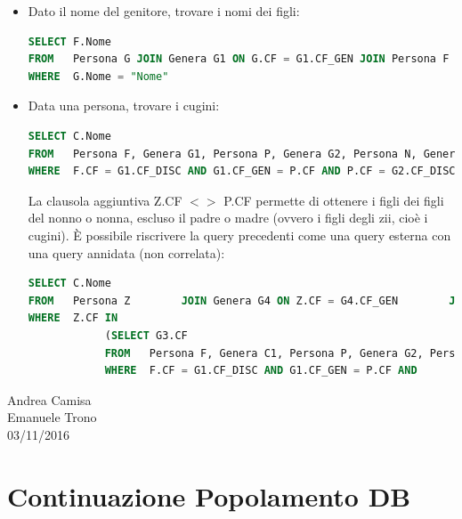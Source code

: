 \begin{itemize}

\item Dato il nome del genitore, trovare i nomi dei figli:

\begin{lstlisting}[language=SQL]
SELECT F.Nome
FROM   Persona G JOIN Genera G1 ON G.CF = G1.CF_GEN JOIN Persona F        ON F.CF = G1.CF_DISC
WHERE  G.Nome = "Nome"
\end{lstlisting}

\item Data una persona, trovare i cugini:

\begin{lstlisting}[language=SQL]
SELECT C.Nome
FROM   Persona F, Genera G1, Persona P, Genera G2, Persona N, Genera G3,        Persona Z, Genera G4, Persona C
WHERE  F.CF = G1.CF_DISC AND G1.CF_GEN = P.CF AND P.CF = G2.CF_DISC AND        G2.CF_GEN = N.CF AND N.CF = G3.CF_GEN AND G3.CF_DISC = Z.CF AND        Z.CF = G4.CF_GEN AND G4.CF_DISC = C.CF        AND Z.CF <> P.CF AND F.Nome = "Nome"
\end{lstlisting}

La clausola aggiuntiva Z.CF $<>$ P.CF permette di ottenere i figli dei figli del nonno o nonna, escluso il padre o madre (ovvero i figli degli zii, cioè i cugini). È possibile riscrivere la query precedenti come una query esterna con una query annidata (non correlata):

\begin{lstlisting}[language=SQL]
SELECT C.Nome
FROM   Persona Z        JOIN Genera G4 ON Z.CF = G4.CF_GEN        JOIN Persona C ON G4.CF_DISC = C.CF
WHERE  Z.CF IN
			(SELECT G3.CF 
			FROM   Persona F, Genera C1, Persona P, Genera G2, Persona N,         Genera G3  
			WHERE  F.CF = G1.CF_DISC AND G1.CF_GEN = P.CF AND         P.CF = G2.CF_DISC AND G2.CF_GEN = N.CF AND         N.CF = G3.CF_GEN AND Z.CF <> P.CF AND F.Nome = "Nome")
\end{lstlisting}

\end{itemize}


\begin{flushright}Andrea Camisa\\Emanuele Trono\\03/11/2016\end{flushright} 


\section{Continuazione Popolamento DB}

